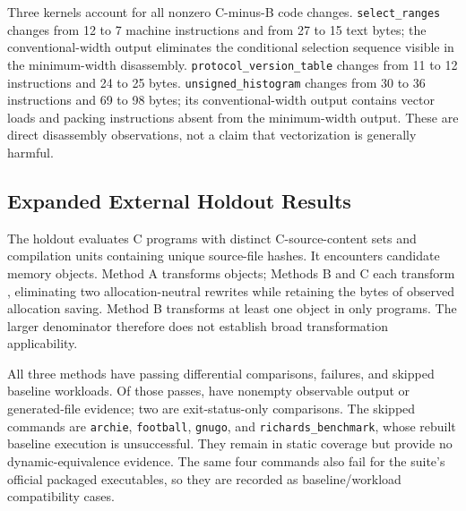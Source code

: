 \documentclass[11pt,twocolumn]{article}
\begin{document}
Three kernels account for all nonzero C-minus-B code changes.
\texttt{select\_ranges} changes from 12 to 7 machine instructions and from
27 to 15 text bytes; the conventional-width output eliminates the conditional
selection sequence visible in the minimum-width disassembly.
\texttt{protocol\_version\_table} changes from 11 to 12 instructions and
24 to 25 bytes. \texttt{unsigned\_histogram} changes from 30 to 36 instructions
and 69 to 98 bytes; its conventional-width output contains vector loads and
packing instructions absent from the minimum-width output. These are direct
disassembly observations, not a claim that vectorization is generally harmful.

\subsection{Expanded External Holdout Results}



The holdout evaluates \ExpandedPrograms{} C programs with
\ExpandedUniquePrograms{} distinct C-source-content sets and
\ExpandedUnits{} compilation units containing \ExpandedUniqueSources{}
unique source-file hashes. It encounters \ExpandedCandidates{} candidate
memory objects. Method A transforms \ExpandedATransformed{} objects;
Methods B and C each transform \ExpandedBTransformed{}, eliminating two
allocation-neutral rewrites while retaining the \ExpandedSavedBytes{} bytes
of observed allocation saving. Method B transforms at least one object in only
\ExpandedAffectedPrograms{} programs. The larger denominator therefore does
not establish broad transformation applicability.

All three methods have \ExpandedPass{} passing differential comparisons,
\ExpandedFail{} failures, and \ExpandedSkip{} skipped baseline workloads.
Of those passes, \ExpandedObservablePass{} have nonempty observable output or
generated-file evidence; two are exit-status-only comparisons. The skipped
commands are \texttt{archie}, \texttt{football}, \texttt{gnugo}, and
\texttt{richards\_benchmark}, whose rebuilt baseline execution is unsuccessful.
They remain in static coverage but provide no dynamic-equivalence evidence.
The same four commands also fail for the suite's official packaged executables,
so they are recorded as baseline/workload compatibility cases.
\end{document}
